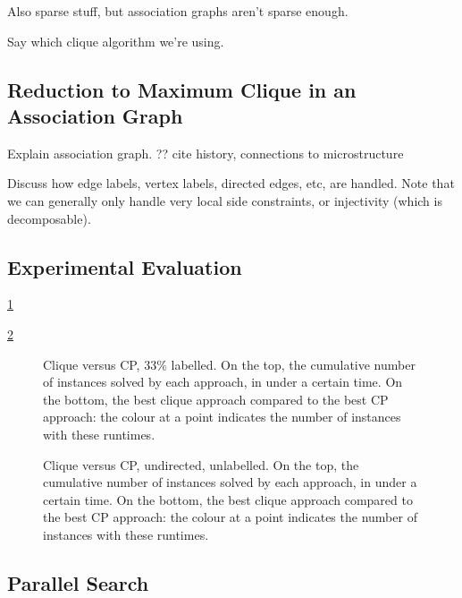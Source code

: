 \documentclass{llncs}
\begin{document}
Also sparse stuff, but association graphs aren't sparse enough.

Say which clique algorithm we're using.

\subsection{Reduction to Maximum Clique in an Association Graph}

Explain association graph. ?? cite history, connections to microstructure

Discuss how edge labels, vertex labels, directed edges, etc, are handled. Note that we can generally
only handle very local side constraints, or injectivity (which is decomposable).

\subsection{Experimental Evaluation}

\cref{figure:unconnected-33}

\cref{figure:unconnected-plain}

\begin{figure}[p]
    \centering
    
    \caption{Clique versus CP, 33\% labelled. On the top, the cumulative
    number of instances solved by each approach, in under a certain time. On the bottom, the best
    clique approach compared to the best CP approach: the colour at a point indicates the number of
    instances with these runtimes.} \label{figure:unconnected-33}
\end{figure}

\begin{figure}[p]
    \centering
    
    \caption{Clique versus CP, undirected, unlabelled. On the top, the cumulative
    number of instances solved by each approach, in under a certain time. On the bottom, the best
    clique approach compared to the best CP approach: the colour at a point indicates the number of
    instances with these runtimes.} \label{figure:unconnected-plain}
\end{figure}

\subsection{Parallel Search}

\cite{DBLP:journals/jcc/KoncDTRJ12,DBLP:journals/algorithms/McCreeshP13,DBLP:journals/topc/McCreeshP15,DBLP:journals/cor/SegundoLP16}
\end{document}
